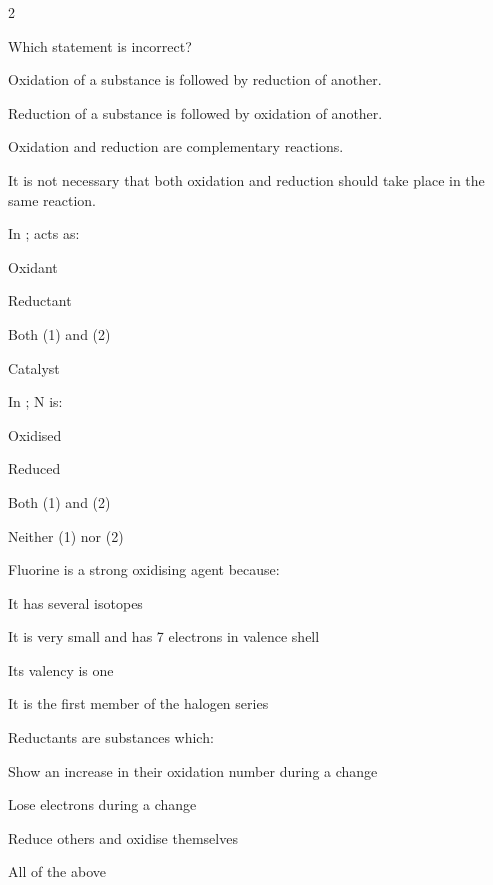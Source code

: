 \documentclass[10pt,a4paper]{article}
\begin{document}
\begin{multicols}{2}
\begin{questions}
\item Which statement is incorrect?
\begin{options}
  \item Oxidation of a substance is followed by reduction of another.
  \item Reduction of a substance is followed by oxidation of another.
  \item Oxidation and reduction are complementary reactions.
  \item It is not necessary that both oxidation and reduction should take place in the same reaction.
\end{options}

\item In ;  acts as:
\begin{options}
  \item Oxidant
  \item Reductant
  \item Both (1) and (2)
  \item Catalyst
\end{options}

\item In ; N is:
\begin{options}
  \item Oxidised
  \item Reduced
  \item Both (1) and (2)
  \item Neither (1) nor (2)
\end{options}

\item Fluorine is a strong oxidising agent because:
\begin{options}
  \item It has several isotopes
  \item It is very small and has 7 electrons in valence shell
  \item Its valency is one
  \item It is the first member of the halogen series
\end{options}

\item Reductants are substances which:
\begin{options}
  \item Show an increase in their oxidation number during a change
  \item Lose electrons during a change
  \item Reduce others and oxidise themselves
  \item All of the above
\end{options}


\end{questions}
\end{multicols}
\end{document}
